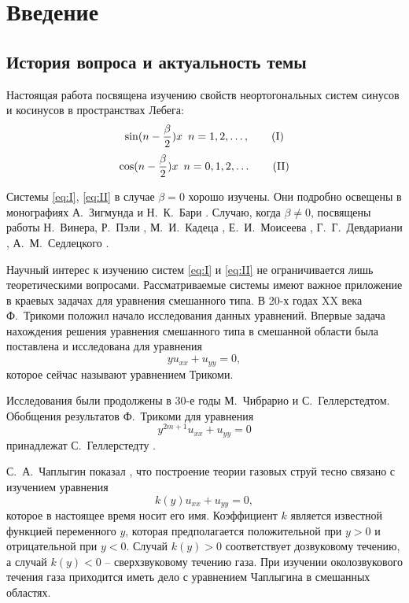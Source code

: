 ﻿\documentclass[oneside, final, 14pt]{extreport}
\begin{document}
\setcounter{chapter}{1}
\chapter*{Введение}

\section{История вопроса и актуальность темы}
Настоящая работа посвящена изучению свойств неортогональных систем синусов и косинусов в пространствах Лебега:
\begin{equation}
	\sin(n - \frac{\beta}{2})x \enspace n = 1, 2, \dots, \tag{I}\label{eq:I}
\end{equation}
\begin{equation}
	\cos(n - \frac{\beta}{2})x \enspace n = 0, 1, 2, \dots \tag{II}\label{eq:II}
\end{equation}

Системы \eqref{eq:I}, \eqref{eq:II} в случае $\beta = 0$ хорошо изучены. Они подробно освещены в монографиях
А.~Зигмунда \cite{zigmund} и Н.~К.~Бари \cite{bari}. Случаю, когда $\beta \neq 0$, посвящены работы 
Н.~Винера, Р.~Пэли \cite{paley-wiener}, М.~И.~Кадеца \cite{kadec}, Е.~И.~Моисеева \cite{moiseev-dan}, 
Г.~Г.~Девдариани \cite{devdariani}, А.~М.~Седлецкого \cite{moiseev-sedleckiy}.

Научный интерес к изучению систем \eqref{eq:I} и \eqref{eq:II} не ограничивается лишь теоретическими вопросами. 
Рассматриваемые системы имеют важное приложение в краевых задачах для уравнения смешанного типа.
В 20-х годах XX века Ф.~Трикоми \cite{trikomi} положил начало исследования данных уравнений. 
Впервые задача нахождения решения уравнения смешанного типа в
смешанной области была поставлена и исследована для уравнения
$$yu_{xx} + u_{yy} = 0,$$
которое сейчас называют уравнением Трикоми.

Исследования были продолжены в 30-е годы М.~Чибрарио и С.~Геллерстедтом. 
Обобщения результатов Ф.~Трикоми для уравнения
$$y^{2m+1}u_{xx} + u_{yy} = 0$$
принадлежат С.~Геллерстедту \cite{gellerstedt}.

С.~А.~Чаплыгин показал \cite{chaplygin}, что построение теории газовых струй тесно
связано с изучением уравнения
$$k(y)u_{xx} + u_{yy} = 0,$$
которое в настоящее время носит его имя. Коэффициент $k$ является
известной функцией переменного $y$, которая предполагается положительной
при $y > 0$ и отрицательной при $y < 0$. Случай $k(y) > 0$ соответствует
дозвуковому течению, а случай $k(y) < 0$ – сверхзвуковому течению газа.
При изучении околозвукового течения газа приходится иметь дело с
уравнением Чаплыгина в смешанных областях.
\end{document}
